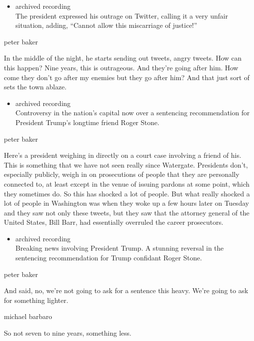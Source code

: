 \begin{itemize}
\tightlist
\item
  archived recording\\
  The president expressed his outrage on Twitter, calling it a very
  unfair situation, adding, ``Cannot allow this miscarriage of
  justice!''
\end{itemize}

peter baker

In the middle of the night, he starts sending out tweets, angry tweets.
How can this happen? Nine years, this is outrageous. And they're going
after him. How come they don't go after my enemies but they go after
him? And that just sort of sets the town ablaze.

\begin{itemize}
\tightlist
\item
  archived recording\\
  Controversy in the nation's capital now over a sentencing
  recommendation for President Trump's longtime friend Roger Stone.
\end{itemize}

peter baker

Here's a president weighing in directly on a court case involving a
friend of his. This is something that we have not seen really since
Watergate. Presidents don't, especially publicly, weigh in on
prosecutions of people that they are personally connected to, at least
except in the venue of issuing pardons at some point, which they
sometimes do. So this has shocked a lot of people. But what really
shocked a lot of people in Washington was when they woke up a few hours
later on Tuesday and they saw not only these tweets, but they saw that
the attorney general of the United States, Bill Barr, had essentially
overruled the career prosecutors.

\begin{itemize}
\tightlist
\item
  archived recording\\
  Breaking news involving President Trump. A stunning reversal in the
  sentencing recommendation for Trump confidant Roger Stone.
\end{itemize}

peter baker

And said, no, we're not going to ask for a sentence this heavy. We're
going to ask for something lighter.

michael barbaro

So not seven to nine years, something less.

